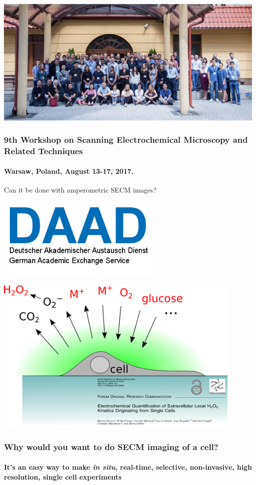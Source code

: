 \documentclass{beamer}
\begin{document}
\begin{frame}
	\centering
	\includegraphics[width=1\textwidth]{poland.eps}
	\frametitle{9th Workshop on Scanning Electrochemical Microscopy and Related Techniques}
	\framesubtitle{Warsaw, Poland, August 13-17, 2017.}
\end{frame}

\begin{frame}[plain]
\centering
Can it be done with amperometric SECM images?
\end{frame}

\begin{frame}[plain]
\centering
\includegraphics[width=0.6\textwidth]{daad.png}
\end{frame}

\begin{frame}
        \centering
        \includegraphics[width=0.9\textwidth]{cell.eps}
        \frametitle{Why would you want to do SECM imaging of a cell?}
	\framesubtitle{It's an easy way to make \emph{in situ}, real-time, selective, non-invasive, high resolution, single cell experiments}
\end{frame}
\end{document}
